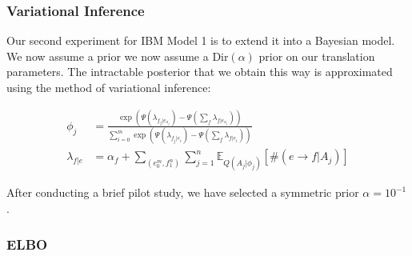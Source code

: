 \documentclass[11pt,a4paper]{article}
\newcommand*\Let[2]{\State #1 $\gets$ #2}
\begin{document}

\subsubsection{Variational Inference}

\label{sec:vi1}

Our second experiment for IBM Model 1 is to extend it into a Bayesian model. We now assume a prior we now assume a $\text{Dir}(\alpha)$ prior on our translation parameters. The intractable posterior that we obtain this way is approximated using the method of variational inference:

\begin{align*}
    \phi_j &= \frac{
        \exp \left( \Psi \left( \lambda_{f_j | e_{a_j}} \right) - \Psi \left( \sum_f \lambda_{f | e_{a_j}} \right) \right)
    }{
        \sum_{i = 0}^m \exp \left( \Psi \left( \lambda_{f_j | e_i} \right) - \Psi \left( \sum_f \lambda_{f | e_i} \right) \right)
    } \\
    \lambda_{f | e} &= \alpha_f + \sum_{(e_0^m, f_1^n)} \sum_{j = 1}^n \mathbb{E}_{Q(A_j | \phi_j)}[\#(e \to f | A_j)]
\end{align*}

        

After conducting a brief pilot study, we have selected a symmetric prior $\alpha = 10^{-1}$.

\subsubsection{ELBO}
\end{document}
